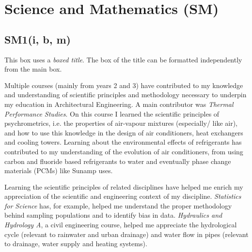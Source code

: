 
\section{Science and Mathematics (SM)}

\subsection*{SM1(i, b, m)}

\begin{tcolorbox}[width=\textwidth/3,leftrule=3mm,enhanced,attach boxed title to top center={yshift=-3mm,yshifttext=-1mm},
  colback=blue!5!white,colframe=blue!75!black,colbacktitle=red!80!black,
  title=My title,fonttitle=\bfseries,
  boxed title style={size=small,colframe=red!50!black} ]
  This box uses a \textit{boxed title}. The box of the title can
  be formatted independently from the main box.
\end{tcolorbox}

Multiple courses (mainly from years 2 and 3) have contributed to my knowledge and understanding of scientific principles and methodology necessary to underpin my education in Architectural Engineering.
A main contributor was \textit{Thermal Performance Studies}.
On this course I learned the scientific principles of psychrometrics, i.e. the properties of air-vapour mixtures (especially/ like air), and how to use this knowledge in the design of air conditioners, heat exchangers and cooling towers.
Learning about the environmental effects of refrigerants has contributed to my understanding of the evolution of air conditioners, from using carbon and fluoride based refrigerants to water and eventually phase change materials (PCMs) like Sunamp uses.

Learning the scientific principles of related disciplines have helped me enrich my appreciation of the scientific and engineering context of my discipline.
\textit{Statistics for Science} has, for example, helped me understand the proper methodology behind sampling populations and to identify bias in data.
\textit{Hydraulics and Hydrology A}, a civil engineering course, helped me appreciate the hydrological cycle (relevant to rainwater and urban drainage) and water flow in pipes (relevant to drainage, water supply and heating systems).


